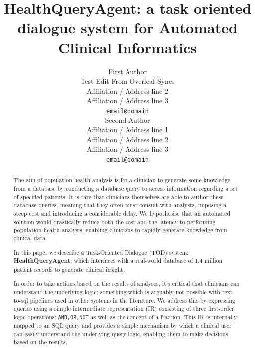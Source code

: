 \documentclass[11pt]{article}
\title{HealthQueryAgent: a task oriented dialogue system for Automated Clinical Informatics}
\author{First Author \\
  Test Edit From Overleaf Syncs \\
  Affiliation / Address line 2 \\
  Affiliation / Address line 3 \\
  \texttt{email@domain} \\\And
  Second Author \\
  Affiliation / Address line 1 \\
  Affiliation / Address line 2 \\
  Affiliation / Address line 3 \\
  \texttt{email@domain} \\}
\begin{document}
\maketitle
\begin{abstract}
The aim of population health analysis is for a clinician to generate some knowledge from a database by conducting a database query to access information regarding a set of specified patients. 
It is rare that clinicians themselves are able to author these database queries, meaning that they often must consult with analysts, imposing a steep cost and introducing a considerable delay. We hypothesise that an automated solution would drastically reduce both the cost and the latency to performing population health analysis, enabling clinicians to rapidly generate knowledge from clinical data.

In this paper we describe a Task-Oriented Dialogue (TOD) system: \textbf{HealthQueryAgent}, which interfaces with a real-world database of 1.4 million patient records to generate clinical insight.

In order to take actions based on the results of analyses, it's critical that clinicians can understand the underlying logic; something which is arguably not possible with text-to-sql pipelines used in other systems in the literature. We address this by expressing queries using a simple intermediate representation (IR) consisting of three first-order logic operations: \texttt{AND,OR,NOT} as well as the concept of a fraction. This IR is internally mapped to an SQL query and provides a simple mechanism by which a clinical user can easily understand the underlying query logic, enabling them to make decisions based on the results.


\end{abstract}
\end{document}
